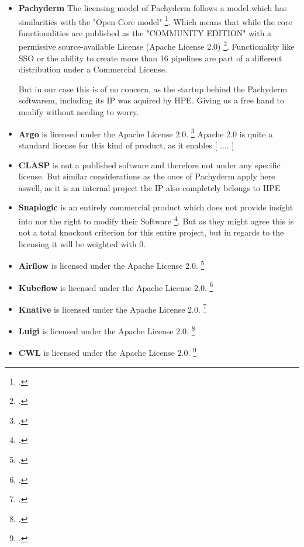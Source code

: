 \begin{itemize}
    \item \textbf{Pachyderm} 
    The licensing model of Pachyderm follows a model which has similarities with the "Open Core model" \footcite{PahcydermPricing2022}.
    Which means that while the core functionalities are published as the "COMMUNITY EDITION" with a permissive source-available License (Apache License 2.0) \footcite{PachydermLICENSEMaster}.
    Functionality like \ac{SSO} or the ability to create more than 16 pipelines are part of a different distribution under a Commercial License.

    But in our case this is of no concern, as the startup behind the Pachyderm softwarem, including its \ac{IP} was aquired by \ac{HPE}.
    Giving us a free hand to modify without needing to worry.

    \item \textbf{Argo} is licensed under the Apache License 2.0. \footcite{ArgocdLICENSEMaster}
    Apache 2.0 is quite a standard license for this kind of product, as it enables  [ .... ]
    \item \textbf{\ac{CLASP}} is not a published software and therefore not under any specific license.
    But similar considerations as the ones of Pachyderm apply here aswell, as it is an internal project the \ac{IP} also completely belongs to \ac{HPE}

    \item \textbf{Snaplogic} is an entirely commercial product which does not provide insight into nor the right to modify their Software \footcite{SnapLogicMasterSubscription}.
    But as they might agree this is not a total knockout criterion for this entire project, but in regards to the licensing it will be weighted with 0.
    \item \textbf{Airflow} is licensed under the Apache License 2.0. \footcite{LicenseAirflowDocumentation}
    \item \textbf{Kubeflow} is licensed under the Apache License 2.0. \footcite{KubeflowLICENSEMaster}
    \item \textbf{Knative} is licensed under the Apache License 2.0. \footcite{KnativeDocsLICENSE}
    \item \textbf{Luigi} is licensed under the Apache License 2.0. \footcite{LuigiLICENSEMaster}
    \item \textbf{CWL} is licensed under the Apache License 2.0. \footcite{CwlutilsLICENSEMain}
    
\end{itemize}

